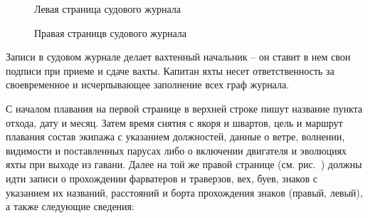 \begin{figure}[htb]
  \begin{minipage}{0.49\textwidth}
    \centering{}
    \caption{Левая страница судового журнала}
    \label{fig:j-page-3}
  \end{minipage}
  \hfill\hfill
  \begin{minipage}{0.49\textwidth}
    \centering{}
    \caption{Правая страницв судового журнала}
    \label{fig:j-page-4}
  \end{minipage}
\end{figure} 

Записи в судовом журнале делает вахтенный начальник \--- он ставит в
нем свои подписи при приеме и сдаче вахты. Капитан яхты несет
ответственность за своевременное и исчерпывающее заполнение всех граф
журнала.
 
С началом плавания на первой странице в верхней строке пишут название
пункта отхода, дату и месяц. Затем время снятия с якоря и швартов,
цель и маршрут плавания состав экипажа с указанием должностей, данные
о ветре, волнении, видимости и поставленных парусах либо о включении
двигателя и эволюциях яхты при выходе из гавани. Далее на той же
правой странице (см. рис.~) должны идти записи о
прохождении фарватеров и траверзов, вех, буев, знаков с указанием их
названий, расстояний и борта прохождения знаков (правый, левый), а
также следующие сведения:

